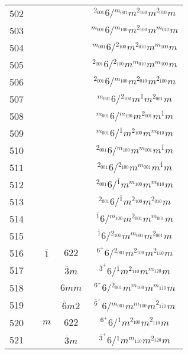 \begin{longtable}{ccccc}
  502 &  &  &  & ${}^{2_{001}} 6  / {}^{m_{001}} m {}^{2_{100}} m {}^{2_{010}} m $\\
  503 &  &  &  & ${}^{m_{001}} 6  / {}^{m_{100}} m {}^{2_{100}} m {}^{m_{010}} m $\\
  504 &  &  &  & ${}^{m_{001}} 6  / {}^{2_{100}} m {}^{2_{010}} m {}^{m_{100}} m $\\
  505 &  &  &  & ${}^{2_{001}} 6  / {}^{2_{100}} m {}^{m_{010}} m {}^{m_{100}} m $\\
  506 &  &  &  & ${}^{2_{001}} 6  / {}^{m_{100}} m {}^{2_{010}} m {}^{2_{100}} m $\\
  507 &  &  &  & ${}^{m_{001}} 6  / {}^{2_{100}} m {}^{\overline{1}} m {}^{2_{001}} m $\\
  508 &  &  &  & ${}^{m_{001}} 6  / {}^{m_{100}} m {}^{2_{001}} m {}^{\overline{1}} m $\\
  509 &  &  &  & ${}^{m_{001}} 6  / {}^{\overline{1}} m {}^{2_{100}} m {}^{m_{010}} m $\\
  510 &  &  &  & ${}^{2_{001}} 6  / {}^{m_{100}} m {}^{m_{001}} m {}^{\overline{1}} m $\\
  511 &  &  &  & ${}^{2_{001}} 6  / {}^{2_{100}} m {}^{m_{001}} m {}^{\overline{1}} m $\\
  512 &  &  &  & ${}^{2_{001}} 6  / {}^{\overline{1}} m {}^{m_{100}} m {}^{m_{010}} m $\\
  513 &  &  &  & ${}^{2_{001}} 6  / {}^{\overline{1}} m {}^{2_{100}} m {}^{2_{010}} m $\\
  514 &  &  &  & ${}^{\overline{1}} 6  / {}^{m_{100}} m {}^{2_{001}} m {}^{m_{001}} m $\\
  515 &  &  &  & ${}^{\overline{1}} 6  / {}^{2_{100}} m {}^{m_{001}} m {}^{2_{001}} m $\\
  516 &  & $\overline{1}$ & $622$ & ${}^{6^{+}} 6  / {}^{2_{001}} m {}^{2_{100}} m {}^{2_{1\overline{1}0}} m $\\
  517 &  &  & $\overline{3}m$ & ${}^{\overline{3}^{+}} 6  / {}^{\overline{1}} m {}^{2_{1\overline{1}0}} m {}^{m_{120}} m $\\
  518 &  &  & $6mm$ & ${}^{6^{+}} 6  / {}^{2_{001}} m {}^{m_{100}} m {}^{m_{1\overline{1}0}} m $\\
  519 &  &  & $\overline{6}m2$ & ${}^{\overline{6}^{+}} 6  / {}^{m_{001}} m {}^{m_{100}} m {}^{2_{1\overline{1}0}} m $\\
  520 &  & $m$ & $622$ & ${}^{6^{+}} 6  / {}^{1} m {}^{2_{100}} m {}^{2_{1\overline{1}0}} m $\\
  521 &  &  & $\overline{3}m$ & ${}^{\overline{3}^{+}} 6  / {}^{1} m {}^{m_{1\overline{1}0}} m {}^{2_{120}} m $\\

\end{longtable}
